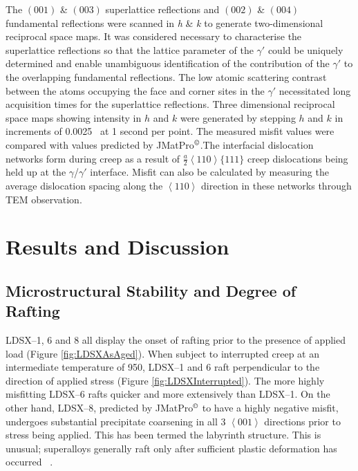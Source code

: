 The $\left(001\right)$ \& $\left(003\right)$ superlattice reflections and $\left(002\right)$ \& $\left(004\right)$ fundamental reflections were scanned in \emph{h} \& \emph{k} to generate two-dimensional reciprocal space maps.  It was considered necessary to characterise the superlattice reflections so that the lattice parameter of the $\gamma'$ could be uniquely determined and enable unambiguous identification of the contribution of the $\gamma'$ to the overlapping fundamental reflections.  The low atomic scattering contrast between the atoms occupying the face and corner sites in the $\gamma'$ necessitated long acquisition times for the superlattice reflections.  Three dimensional reciprocal space maps showing intensity in $h$ and $k$ were generated by stepping $h$ and $k$ in increments of 0.0025 \angstrom\ at 1 second per point.  The measured misfit values were compared with values predicted by JMatPro$^{\copyright}$.The interfacial dislocation networks form during creep as a result of $\frac{a}{2}\left<110\right>\{111\}$ creep dislocations being held up at the $\gamma$/$\gamma'$ interface. Misfit can also be calculated by measuring the average dislocation spacing along the $\left<110\right>$ direction in these networks through TEM observation.

\section{Results and Discussion}

\subsection{Microstructural Stability and Degree of Rafting}

LDSX--1, 6 and 8 all display the onset of rafting prior to the presence of applied load (Figure \ref{fig:LDSXAsAged}).  When subject to interrupted creep at an intermediate temperature of 950\celsius, LDSX--1 and 6 raft perpendicular to the direction of applied stress (Figure \ref{fig:LDSXInterrupted}).  The more highly misfitting LDSX--6 rafts quicker and more extensively than LDSX--1.  On the other hand, LDSX--8, predicted by JMatPro$^{\copyright}$ to have a highly negative misfit, undergoes substantial precipitate coarsening in all 3 $\left<001\right>$ directions prior to stress being applied.  This has been termed the labyrinth structure.  This is unusual; superalloys generally raft only after sufficient plastic deformation has occurred ~\cite{reed99}.

